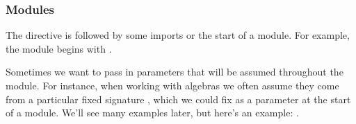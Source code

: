 \subsubsection{Modules}\label{modules}

The  directive is followed by some imports or the start of a module.
For example, the \Preliminaries module begins with \AgdaSpace{}%
\AgdaSpace{}.

Sometimes we want to pass in parameters that will be assumed throughout the module. For instance, when working with algebras we often assume they come from a particular fixed signature , which we could fix as a parameter at the start of a module. We'll see many examples later, but here's an example:
\AgdaSpace{}\AgdaModule{\AgdaUnderscore{}}\AgdaSpace{}%
\AgdaSymbol{\{}\AgdaSpace{}%
\AgdaSymbol{:}\AgdaSpace{}%
\AgdaSpace{}%
\AgdaSpace{}%
\AgdaSymbol{\}}\AgdaSpace{}%
.


